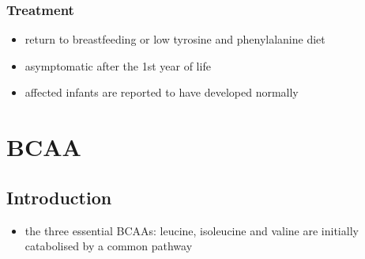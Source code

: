 \documentclass{scrartcl}
\begin{document}
\subsubsection{Treatment}
\label{sec:orgdea3c18}
\begin{itemize}
\item return to breastfeeding or low tyrosine and phenylalanine diet
\item asymptomatic after the 1st year of life
\item affected infants are reported to have developed normally
\end{itemize}

\section{BCAA}
\label{sec:org47881e9}
\subsection{Introduction}
\label{sec:orgf476b46}
\begin{itemize}
\item the three essential BCAAs: leucine, isoleucine and valine are
initially catabolised by a common pathway
\end{itemize}

\chemnameinit{}
\chemnameinit{}
\chemnameinit{}
\end{document}
